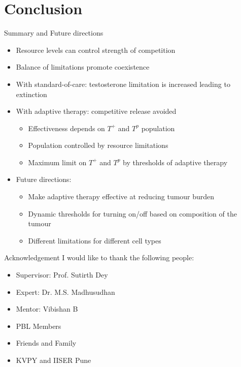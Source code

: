 \section{Conclusion}

\begin{frame}{Summary and Future directions}
  \begin{itemize}
    \item<1-> Resource levels can control strength of competition
    \item<2-> Balance of limitations promote coexistence
    \item<3-> With standard-of-care: testosterone limitation is increased leading to extinction
    \item<4-> With adaptive therapy: competitive release avoided
    \begin{itemize}
      \item Effectiveness depends on $T^+$ and $T^p$ population
      \item Population controlled by resource limitations
      \item Maximum limit on $T^+$ and $T^p$ by thresholds of adaptive therapy
    \end{itemize}
    \item<5-> Future directions:
    \begin{itemize}
      \item<6-> Make adaptive therapy effective at reducing tumour burden
      \item<7-> Dynamic thresholds for turning on/off based on composition of the tumour
      \item<8-> Different limitations for different cell types
    \end{itemize}
  \end{itemize}
\end{frame}

\begin{frame}{Acknowledgement}
  I would like to thank the following people:
  \begin{itemize}
    \item Supervisor: Prof. Sutirth Dey
    \item Expert: Dr. M.S. Madhusudhan
    \item Mentor: Vibishan B
    \item PBL Members
    \item Friends and Family
    \item KVPY and IISER Pune
  \end{itemize}
\end{frame}
